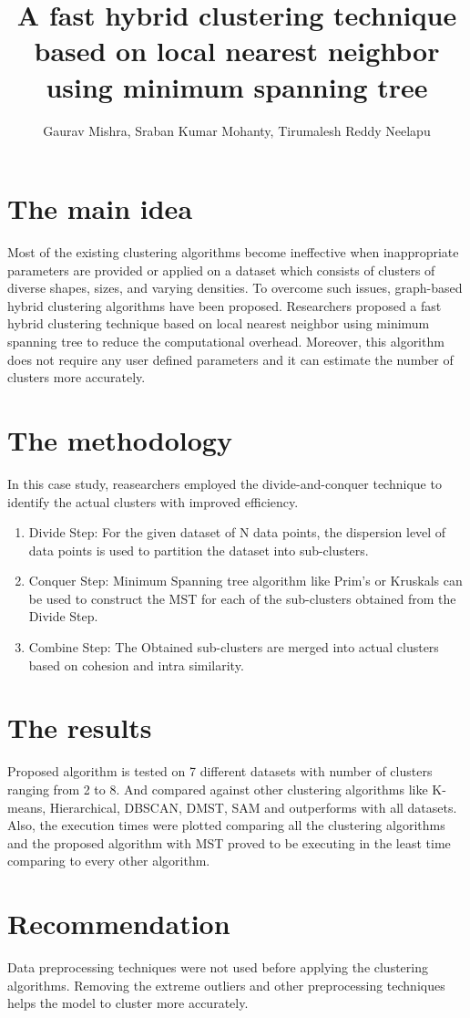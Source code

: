 \documentclass[a4paper]{article}
\title{A fast hybrid clustering technique based on local nearest neighbor using minimum spanning tree}
\author[1]{Gaurav Mishra, Sraban Kumar Mohanty, Tirumalesh Reddy Neelapu}
\begin{document}
\maketitle
\section{The main idea}

Most of the existing clustering algorithms become ineffective when inappropriate parameters are provided or applied on a dataset which consists of clusters of diverse shapes, sizes, and varying densities. To overcome such issues, graph-based hybrid clustering algorithms have been proposed. Researchers proposed a fast hybrid clustering technique based on local nearest neighbor using minimum spanning tree to reduce the computational overhead. Moreover, this algorithm does not require any user defined parameters and it can estimate the number of clusters more accurately.

\section{The methodology }

In this case study, reasearchers employed the divide-and-conquer technique to identify the actual clusters with improved efficiency. 
\begin{enumerate}
\item Divide Step:
	For the given dataset of N data points, the dispersion level of data points is used to partition the dataset into sub-clusters.

\item Conquer Step:
	Minimum Spanning tree algorithm like Prim’s or Kruskals can be used to construct the MST for each of the sub-clusters obtained from the Divide Step.

\item Combine Step:
	The Obtained sub-clusters are merged into actual clusters based on cohesion and intra similarity.
\end{enumerate}

\section{The results}
 
Proposed algorithm is tested on 7 different datasets with number of clusters ranging from 2 to 8. And compared against other clustering algorithms like K-means, Hierarchical, DBSCAN, DMST, SAM and outperforms with all datasets. Also, the execution times were plotted comparing all the clustering algorithms and the proposed algorithm with MST proved to be executing in the least time comparing to every other algorithm.

\section{Recommendation}

Data preprocessing techniques were not used before applying the clustering algorithms. Removing the extreme outliers and other preprocessing techniques helps the model to cluster more accurately.
\end{document}
